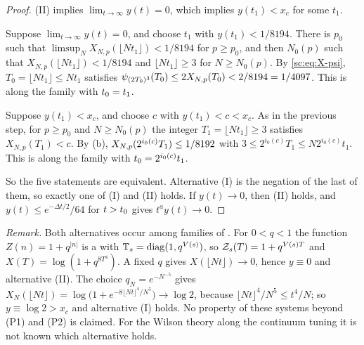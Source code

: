 \begin{proof}
(II) implies $\lim_{t\to\infty}y(t)=0$, which implies $y(t_1)<x_c$ for some $t_1$.

Suppose $\lim_{t\to\infty}y(t)=0$, and choose $t_1$ with $y(t_1)<1/8194$. There is $p_0$ such that $\limsup_NX_{N,p}(\lfloor Nt_1\rfloor)<1/8194$ for $p\ge p_0$, and then $N_0(p)$ such that $X_{N,p}(\lfloor Nt_1\rfloor)<1/8194$ and $\lfloor Nt_1\rfloor\ge3$ for $N\ge N_0(p)$. By \eqref{sc:eq:X-psi}, $T_0=\lfloor Nt_1\rfloor\le Nt_1$ satisfies $\psi_{(2T_0)^3}(T_0)\le2X_{N,p}(T_0)<2/8194=1/4097$. This is \Mcirc{} along the family with $t_0=t_1$.

Suppose $y(t_1)<x_c$, and choose $c$ with $y(t_1)<c<x_c$. As in the previous step, for $p\ge p_0$ and $N\ge N_0(p)$ the integer $T_1=\lfloor Nt_1\rfloor\ge3$ satisfies $X_{N,p}(T_1)<c$. By (b), $X_{N,p}(2^{i_0(c)}T_1)\le1/8192$ with $3\le2^{i_0(c)}T_1\le N2^{i_0(c)}t_1$. This is \Bcirc{} along the family with $t_0=2^{i_0(c)}t_1$.

So the five statements are equivalent. Alternative (I) is the negation of the last of them, so exactly one of (I) and (II) holds. If $y(t)\to0$, then (II) holds, and $y(t)\le e^{-\Delta t/2}/64$ for $t>t_0$ gives $t^ay(t)\to0$.
\end{proof}

\noindent\emph{Remark.} Both alternatives occur among families of \PSTS{}. For $0<q<1$ the function $Z(n)=1+q^{|n|}$ is a \PSTS{} with $\mathbb T_s=\mathrm{diag}(1,q^{V(s)})$, so $\mathcal Z_{s}(T)=1+q^{V(s)T}$ and $X(T)=\log(1+q^{8T^4})$. A fixed $q$ gives $X(\lfloor Nt\rfloor)\to0$, hence $y\equiv0$ and alternative (II). The choice $q_N=e^{-N^{-5}}$ gives $X_N(\lfloor Nt\rfloor)=\log\bigl(1+e^{-8\lfloor Nt\rfloor^4/N^5}\bigr)\to\log2$, because $\lfloor Nt\rfloor^4/N^5\le t^4/N$; so $y\equiv\log2>x_c$ and alternative (I) holds. No property of these systems beyond (P1) and (P2) is claimed. For the Wilson theory along the continuum tuning it is not known which alternative holds.

